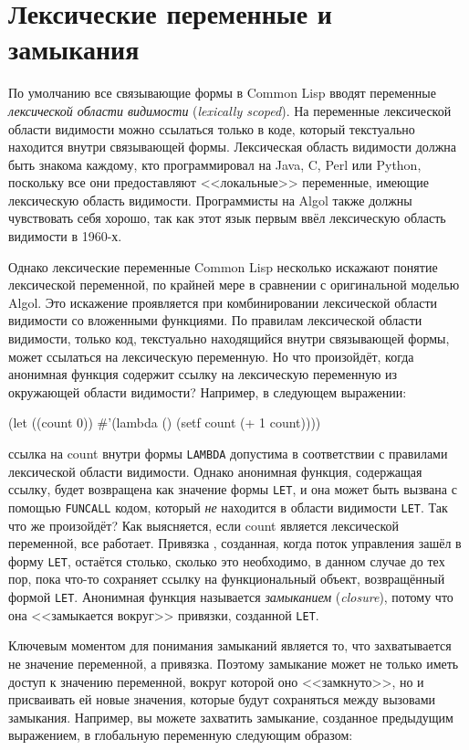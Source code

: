 \section{Лексические переменные и замыкания}

По умолчанию все связывающие формы в Common Lisp вводят переменные \textit{лексической
  области видимости} (\textit{lexically scoped}). На переменные лексической области
видимости можно ссылаться только в коде, который текстуально находится внутри связывающей
формы. Лексическая область видимости должна быть знакома каждому, кто программировал на
Java, C, Perl или Python, поскольку все они предоставляют <<локальные>> переменные, имеющие
лексическую область видимости. Программисты на Algol также должны чувствовать себя хорошо,
так как этот язык первым ввёл лексическую область видимости в 1960-х.

Однако лексические переменные Common Lisp несколько искажают понятие лексической
переменной, по крайней мере в сравнении с оригинальной моделью Algol. Это искажение
проявляется при комбинировании лексической области видимости со вложенными функциями. По
правилам лексической области видимости, только код, текстуально находящийся внутри
связывающей формы, может ссылаться на лексическую переменную. Но что произойдёт, когда
анонимная функция содержит ссылку на лексическую переменную из окружающей области
видимости? Например, в следующем выражении:

\begin{myverb}
  (let ((count 0)) #'(lambda () (setf count (+ 1 count))))
\end{myverb}

\noindent{}ссылка на count внутри формы \lstinline{LAMBDA} допустима в соответствии с правилами
лексической области видимости. Однако анонимная функция, содержащая ссылку, будет
возвращена как значение формы \lstinline{LET}, и она может быть вызвана с помощью
\lstinline{FUNCALL} кодом, который \textit{не} находится в области видимости
\lstinline{LET}. Так что же произойдёт? Как выясняется, если count является лексической
переменной, все работает. Привязка , созданная, когда поток управления зашёл в форму
\lstinline{LET}, остаётся столько, сколько это необходимо, в данном случае до тех пор, пока
что-то сохраняет ссылку на функциональный объект, возвращённый формой
\lstinline{LET}. Анонимная функция называется \textit{замыканием} (\textit{closure}), потому
что она <<замыкается вокруг>> привязки, созданной \lstinline{LET}.

Ключевым моментом для понимания замыканий является то, что захватывается не значение
переменной, а привязка. Поэтому замыкание может не только иметь доступ к значению
переменной, вокруг которой оно <<замкнуто>>, но и присваивать ей новые значения, которые
будут сохраняться между вызовами замыкания. Например, вы можете захватить замыкание,
созданное предыдущим выражением, в глобальную переменную следующим образом:

